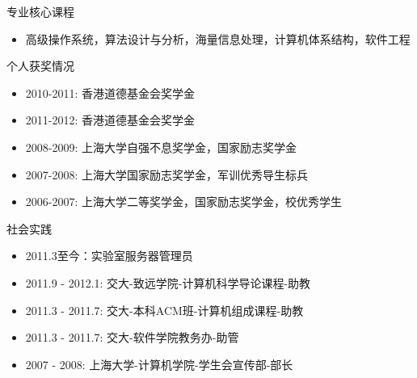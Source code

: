 \documentclass[8pt,handout]{beamer}
\begin{document}
\begin{CJK*}{UTF8}{gkai}
\begin{frame}{}
\begin{block}{专业核心课程}
\begin{itemize}
	\item 高级操作系统，算法设计与分析，海量信息处理，计算机体系结构，软件工程
\end{itemize}
\end{block}
\begin{block}{个人获奖情况}
\begin{itemize}
	\item 2010-2011: 香港道德基金会奖学金
	\item 2011-2012: 香港道德基金会奖学金
	\item 2008-2009: 上海大学自强不息奖学金，国家励志奖学金
	\item 2007-2008: 上海大学国家励志奖学金，军训优秀导生标兵
	\item 2006-2007: 上海大学二等奖学金，国家励志奖学金，校优秀学生
\end{itemize}
\end{block}
\begin{block}{社会实践}
\begin{itemize}
	\item 2011.3至今：实验室服务器管理员
	\item 2011.9 - 2012.1: 交大-致远学院-计算机科学导论课程-助教
	\item 2011.3 - 2011.7: 交大-本科ACM班-计算机组成课程-助教
	\item 2011.3 - 2011.7: 交大-软件学院教务办-助管
	\item 2007 - 2008: 上海大学-计算机学院-学生会宣传部-部长
\end{itemize}
\end{block}
\end{frame}
\end{CJK*}
\end{document}
